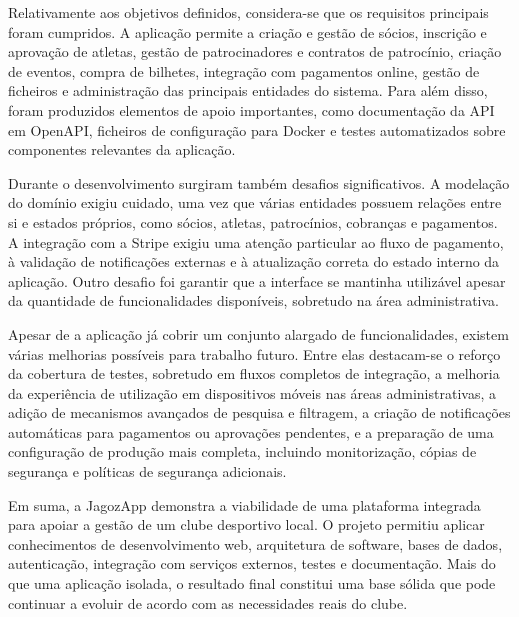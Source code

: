 Relativamente aos objetivos definidos, considera-se que os requisitos principais foram cumpridos. A aplicação permite a criação e gestão de sócios, inscrição e aprovação de atletas, gestão de patrocinadores e contratos de patrocínio, criação de eventos, compra de bilhetes, integração com pagamentos online, gestão de ficheiros e administração das principais entidades do sistema. Para além disso, foram produzidos elementos de apoio importantes, como documentação da API em OpenAPI, ficheiros de configuração para Docker e testes automatizados sobre componentes relevantes da aplicação.

Durante o desenvolvimento surgiram também desafios significativos. A modelação do domínio exigiu cuidado, uma vez que várias entidades possuem relações entre si e estados próprios, como sócios, atletas, patrocínios, cobranças e pagamentos. A integração com a Stripe exigiu uma atenção particular ao fluxo de pagamento, à validação de notificações externas e à atualização correta do estado interno da aplicação. Outro desafio foi garantir que a interface se mantinha utilizável apesar da quantidade de funcionalidades disponíveis, sobretudo na área administrativa.

Apesar de a aplicação já cobrir um conjunto alargado de funcionalidades, existem várias melhorias possíveis para trabalho futuro. Entre elas destacam-se o reforço da cobertura de testes, sobretudo em fluxos completos de integração, a melhoria da experiência de utilização em dispositivos móveis nas áreas administrativas, a adição de mecanismos avançados de pesquisa e filtragem, a criação de notificações automáticas para pagamentos ou aprovações pendentes, e a preparação de uma configuração de produção mais completa, incluindo monitorização, cópias de segurança e políticas de segurança adicionais.

Em suma, a JagozApp demonstra a viabilidade de uma plataforma integrada para apoiar a gestão de um clube desportivo local. O projeto permitiu aplicar conhecimentos de desenvolvimento web, arquitetura de software, bases de dados, autenticação, integração com serviços externos, testes e documentação. Mais do que uma aplicação isolada, o resultado final constitui uma base sólida que pode continuar a evoluir de acordo com as necessidades reais do clube.
